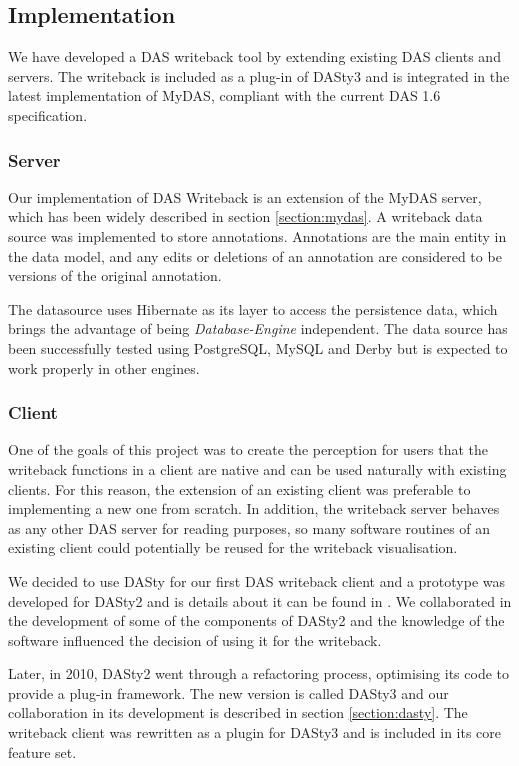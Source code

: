 \subsection{Implementation}
We have developed a DAS writeback tool by extending existing DAS clients and servers. The writeback is included as a plug-in of DASty3 and is integrated in the latest implementation of MyDAS, compliant with the current DAS 1.6 specification. 

\subsubsection{Server}
Our implementation of DAS Writeback is an extension of the MyDAS server, which has been widely described in section \ref{section:mydas}. A writeback data source was implemented to store annotations. Annotations are the main entity in the data model, and any edits or deletions of an annotation are considered to be versions of the original annotation.

The datasource uses Hibernate \cite{BAU2006} as its layer to access the persistence data, which brings the advantage of being \emph{Database-Engine} independent. The data source has been successfully tested using PostgreSQL, MySQL and Derby but is expected to work properly in other engines.

\subsubsection{Client}\label{section:dastywb}
One of the goals of this project was to create the perception for users that the writeback functions in a client are native and can be used naturally with existing clients. For this reason, the extension of an existing client was preferable to implementing a new one from scratch. In addition, the writeback server behaves as any other DAS server for reading purposes, so many software routines of an existing client could potentially be reused for the writeback visualisation.

We decided to use DASty for our first DAS writeback client and a prototype was developed for DASty2 and is details about it can be found in \cite{SAL2010}. We collaborated in the development of some of the components of DASty2 \cite{JIM2008} and the knowledge of the software influenced the decision of using it for the writeback.

Later, in 2010, DASty2 went through a refactoring process, optimising its code to provide a plug-in framework. The new version is called DASty3 and our collaboration in its development is described in section \ref{section:dasty}. The writeback client was rewritten as a plugin for DASty3 and is included in its core feature set.

